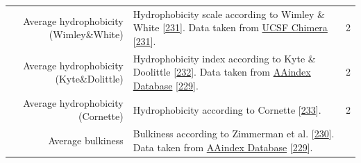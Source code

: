 \documentclass[11pt,a4paper,twoside]{book}
\theoremstyle{definition}
\theoremstyle{definition}
\theoremstyle{remark}
\begin{document}
\begin{longtable}[]{@{}rlc@{}}
\begin{minipage}[t]{0.23\columnwidth}
Average hydrophobicity (Wimley\&White)\strut
\end{minipage} & \begin{minipage}[t]{0.50\columnwidth}\raggedright\strut
Hydrophobicity scale according to Wimley \& White
{[}\protect\hyperlink{ref-Wimley1996}{231}{]}. Data taken from
\href{https://www.cgl.ucsf.edu/chimera/docs/ContributedSoftware/defineattrib/wwHydrophobicity.txt}{UCSF
Chimera} {[}\protect\hyperlink{ref-Wimley1996}{231}{]}.\strut
\end{minipage} & \begin{minipage}[t]{0.18\columnwidth}\centering\strut
2\strut
\end{minipage}\tabularnewline
\begin{minipage}[t]{0.23\columnwidth}\raggedleft\strut
Average hydrophobicity (Kyte\&Dolittle)\strut
\end{minipage} & \begin{minipage}[t]{0.50\columnwidth}\raggedright\strut
Hydrophobicity index according to Kyte \& Doolittle
{[}\protect\hyperlink{ref-Kyte1982}{232}{]}. Data taken from
\href{http://www.genome.jp/dbget-bin/www_bget?aaindex:KYTJ820101}{AAindex
Database} {[}\protect\hyperlink{ref-Kawashima2008}{229}{]}.\strut
\end{minipage} & \begin{minipage}[t]{0.18\columnwidth}\centering\strut
2\strut
\end{minipage}\tabularnewline
\begin{minipage}[t]{0.23\columnwidth}\raggedleft\strut
Average hydrophobicity (Cornette)\strut
\end{minipage} & \begin{minipage}[t]{0.50\columnwidth}\raggedright\strut
Hydrophobicity according to Cornette
{[}\protect\hyperlink{ref-Cornette1987}{233}{]}.\strut
\end{minipage} & \begin{minipage}[t]{0.18\columnwidth}\centering\strut
2\strut
\end{minipage}\tabularnewline
\begin{minipage}[t]{0.23\columnwidth}\raggedleft\strut
Average bulkiness\strut
\end{minipage} & \begin{minipage}[t]{0.50\columnwidth}\raggedright\strut
Bulkiness according to Zimmerman et al.
{[}\protect\hyperlink{ref-Zimmerman1968}{230}{]}. Data taken from
\href{http://www.genome.jp/dbget-bin/www_bget?aaindex:ZIMJ680102}{AAindex
Database} {[}\protect\hyperlink{ref-Kawashima2008}{229}{]}.\strut

\end{minipage}
\end{longtable}
\end{document}
